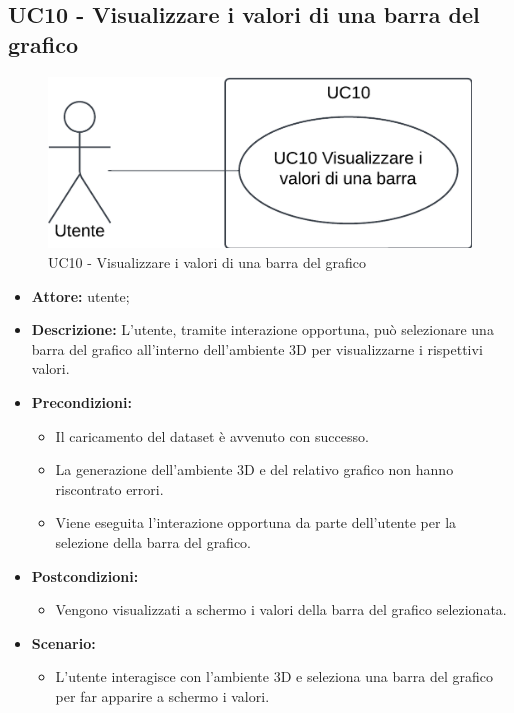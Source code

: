 \subsection{UC10 - Visualizzare i valori di una barra del grafico}
\begin{figure}[h!]\centering
    \includegraphics[scale=0.7]{template/images/UC10.png}
    \caption{UC10 - Visualizzare i valori di una barra del grafico}
\end{figure}
\begin{itemize}    
    \item \textbf{Attore:} utente;
    \item \textbf{Descrizione:} L'utente, tramite interazione opportuna, può selezionare una barra del grafico all'interno dell'ambiente 3D per visualizzarne i rispettivi valori.
    \item \textbf{Precondizioni:}    
        \begin{itemize}
            \item Il caricamento del dataset è avvenuto con successo.
            \item La generazione dell'ambiente 3D e del relativo grafico non hanno riscontrato errori.
            \item Viene eseguita l'interazione opportuna da parte dell'utente per la selezione della barra del grafico.
        \end{itemize}    
    \item \textbf{Postcondizioni:}
        \begin{itemize}
            \item Vengono visualizzati a schermo i valori della barra del grafico selezionata.
        \end{itemize}    
    \item \textbf{Scenario:} 
        \begin{itemize}
            \item L'utente interagisce con l'ambiente 3D e seleziona una barra del grafico per far apparire a schermo i valori.
        \end{itemize}
\end{itemize}

